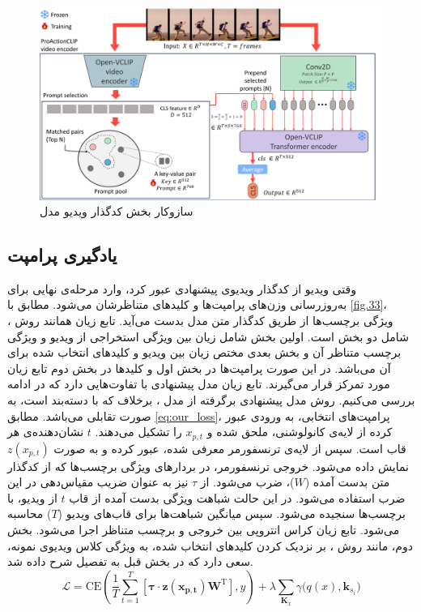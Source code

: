 \begin{figure}
	\centering\includegraphics[scale=.65]{Images/Chapter3/video_encoder.png}
	\caption[]{سازوکار بخش کدگذار ویدیو مدل }
	\label{fig.34}
\end{figure}
\subsection{یادگیری پرامپت}
وقتی ویدیو از کدگذار ویدیوی پیشنهادی عبور کرد، وارد مرحله‌ی نهایی برای به‌روزرسانی وزن‌های پرامپت‌ها و کلید‌های متناظرشان می‌شود. مطابق با \cref{fig.33}، ویژگی برچسب‌ها از طریق کدگذار متن مدل  بدست می‌آید. تابع زیان همانند روش ، شامل دو بخش است. اولین بخش شامل زیان بین ویژگی استخراجی از ویدیو و ویژگی برچسب متناظر آن و بخش بعدی مختص زیان بین ویدیو و کلیدهای انتخاب شده برای آن می‌باشد. در این صورت پرامپت‌ها در بخش اول و کلیدها در بخش دوم تابع زیان مورد تمرکز قرار می‌گیرند. تابع زیان مدل پیشنهادی با  تفاوت‌هایی دارد که در ادامه بررسی می‌کنیم. روش مدل پیشنهادی برگرفته از مدل ، برخلاف  که با دسته‌بند است، به صورت تقابلی می‌باشد. مطابق \eqref{eq:our_loss}، پرامپت‌های انتخابی، به ورودی عبور کرده از لایه‌ی کانولوشنی، ملحق شده و $x_{p,t}$ را تشکیل می‌دهند. $t$ نشان‌دهنده‌ی هر قاب است. سپس از لایه‌ی ترنسفورمر معرفی شده، عبور کرده و به صورت $z(x_{p,t})$ نمایش داده می‌شود. خروجی ترنسفورمر، در بردارهای ویژگی برچسب‌ها که از کدگذار متن بدست آمده ($W$)، ضرب می‌شود. از $\tau$ نیز به عنوان ضریب مقیاس‌دهی در این ضرب استفاده می‌شود. در این حالت شباهت ویژگی بدست آمده از قاب $t$ از ویدیو، با برچسب‌ها سنجیده می‌شود. سپس میانگین شباهت‌ها برای قاب‌های ویدیو ($T$) محاسبه می‌شود. تابع زیان کراس انتروپی بین خروجی و برچسب‌ متناظر اجرا می‌شود. بخش دوم، مانند روش ، بر نزدیک کردن کلیدهای انتخاب شده، به ویژگی کلاس ویدیوی نمونه، سعی دارد که در بخش قبل به تفصیل شرح داده شد.
\begin{equation}\label{eq:our_loss}
	\mathcal{L} = \mathrm{CE} \left( 
	\frac{1}{T} \sum_{t=1}^{T} 
	\left[ 
	\mathbf{\tau \cdot z(x_{p,t})} \mathbf{W}^{\mathrm{T}} 
	\right], 
	y 
	\right) 
	+ \lambda \sum_{\mathbf{K}_x} \gamma \big( q(x), \mathbf{k}_{s_i} \big)
\end{equation}


